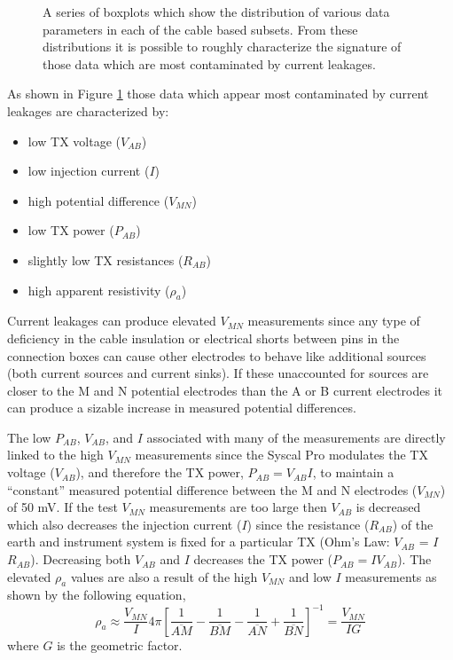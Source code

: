 \documentclass[final,authoryear,5p,times,twocolumn]{elsarticle}
\begin{document}
\begin{figure} [!ht]
\begin{center}
{       } %
    \end{center}
\caption{A series of boxplots which show the distribution of various data parameters in each of the cable based subsets. From these distributions it is possible to roughly characterize the signature of those data which are most contaminated by current leakages.}
\label{fig:CableSplit_Cluster_PropBoxPlots}
\end{figure}

As shown in Figure \ref{fig:CableSplit_Cluster_PropBoxPlots} those data which appear most contaminated by current leakages are characterized by:
\begin{itemize}
	\item{low TX voltage ($V_{AB}$)}
	\item{low injection current ($I$)}
	\item{high potential difference ($V_{MN}$)}
	\item{low TX power ($P_{AB}$)}
	\item{slightly low TX resistances ($R_{AB}$)}
	\item{high apparent resistivity ($\rho_{a}$)}
\end{itemize}
Current leakages can produce elevated $V_{MN}$ measurements since any type of deficiency in the cable insulation or electrical shorts between pins in the connection boxes can cause other electrodes to behave like additional sources (both current sources and current sinks). If these unaccounted for sources are closer to the M and N potential electrodes than the A or B current electrodes it can produce a sizable increase in measured potential differences. 

The low $P_{AB}$, $V_{AB}$, and $I$ associated with many of the measurements are directly linked to the high $V_{MN}$ measurements since the Syscal Pro modulates the TX voltage ($V_{AB}$), and therefore the TX power, $P_{AB} = V_{AB} I$, to maintain a ``constant'' measured potential difference between the M and N electrodes ($V_{MN}$) of 50 mV. If the test $V_{MN}$ measurements are too large then $V_{AB}$ is decreased which also decreases the injection current ($I$) since the resistance ($R_{AB}$) of the earth and instrument system is fixed for a particular TX (Ohm's Law: $V_{AB}$ = $I$ $R_{AB}$). Decreasing both $V_{AB}$ and $I$ decreases the TX power ($P_{AB} = I V_{AB}$). The elevated $\rho_{a}$ values are also a result of the high $V_{MN}$ and low $I$ measurements as shown by the following equation,  
\begin{equation}
 \rho_{a} \approx \frac{V_{MN}}{I} 4 \pi \left[ \frac{1}{\overline{AM}} - \frac{1}{\overline{BM}} - \frac{1}{\overline{AN}} + \frac{1}{\overline{BN}} \right]^{-1} = \frac{V_{MN}}{IG}
\end{equation}    
where $G$ is the geometric factor.
\end{document}
